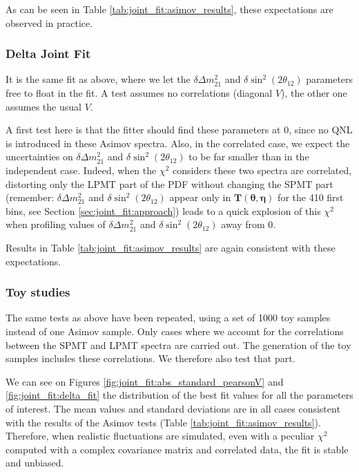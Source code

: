 \documentclass[../main.tex]{subfiles}
\begin{document}
As can be seen in Table \ref{tab:joint_fit:asimov_results}, these expectations are observed in practice.

\subsubsection{Delta Joint Fit}

It is the same fit as above, where we let the $\delta \Delta m^2_{21}$ and $\delta \sin^2(2 \theta_{12})$ parameters free to float in the fit. A test assumes no correlations (diagonal $V$), the other one assumes the usual $V$.

A first test here is that the fitter should find these parameters at 0, since no QNL is introduced in these Asimov spectra. Also, in the correlated case, we expect the uncertainties on $\delta \Delta m^2_{21}$ and $\delta \sin^2(2 \theta_{12})$ to be far smaller than in the independent case. Indeed, when the $\chi^2$ considers these two spectra are correlated, distorting only the LPMT part of the PDF without changing the SPMT part (remember: $\delta \Delta m^2_{21}$ and $\delta \sin^2(2 \theta_{12})$ appear only in $\bm{T}(\bm{\theta}, \bm{\eta})$ for the 410 first bins, see Section \ref{sec:joint_fit:approach}) leads to a quick explosion of this $\chi^2$ when profiling values of $\delta \Delta m^2_{21}$ and $\delta \sin^2(2 \theta_{12})$ away from 0.

Results in Table \ref{tab:joint_fit:asimov_results} are again consistent with these expectations.

\subsubsection{Toy studies}


The same tests as above have been repeated, using a set of 1000 toy samples instead of one Asimov sample. Only cases where we account for the correlations between the SPMT and LPMT spectra are carried out. The generation of the toy samples includes these correlations. We therefore also test that part.


We can see on Figures \ref{fig:joint_fit:abs_standard_pearsonV} and \ref{fig:joint_fit:delta_fit} the distribution of the best fit values for all the parameters of interest.
The mean values and standard deviations are in all cases consistent with the results of the Asimov tests (Table \ref{tab:joint_fit:asimov_results}). Therefore, when realistic fluctuations are simulated, even with a peculiar $\chi^2$ computed with a complex covariance matrix and correlated data, the fit is stable and unbiased.
\end{document}
